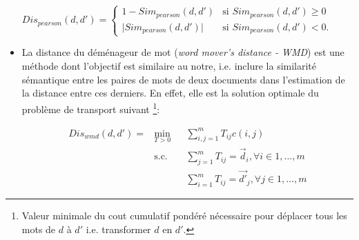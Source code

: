 \begin{itemize}
$Dis_{pearson}(d,d') =
\left\{ \begin{array}{ll}
1 - Sim_{pearson}(d,d') & \text{si } Sim_{pearson}(d,d') \geq 0 \\
\vert Sim_{pearson}(d,d') \vert & \text{si } Sim_{pearson}(d,d') < 0.
\end{array}
\right.$
	\item \og La distance du déménageur de mot \fg{} (\textit{word mover's distance - WMD}) \citep{kusner2015wordmoverdist} est une méthode dont l'objectif est similaire au notre, i.e. inclure la similarité sémantique entre les paires de mots de deux documents dans l'estimation de la distance entre ces derniers. En effet, elle est la solution optimale du problème de transport suivant \footnote{Valeur minimale du cout cumulatif pondéré nécessaire pour déplacer  tous les mots de $d$ à $d'$ i.e. transformer $d$ en $d'$.}:
	
	\begin{equation*}
	\begin{aligned}
Dis_{wmd}(d, d') = 	& \min\limits_{T>0}
	& & \sum\limits_{i,j=1}^m T_{ij} c(i,j) \\
	& \text{s.c.}
	& & \sum\limits_{j=1}^m T_{ij} = \vec{d}_i, \forall i \in {1, \dots, m} \\
	& 
	& & \sum\limits_{i=1}^m T_{ij} = \vec{d'}_j, \forall j \in {1, \dots, m}	
	\end{aligned}
	\end{equation*} 
	

\end{itemize}
